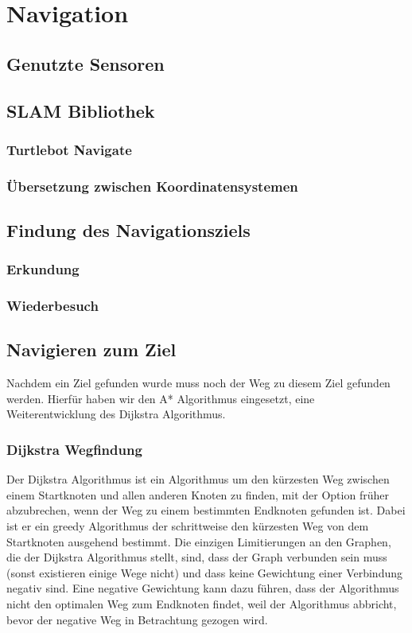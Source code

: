 \section{Navigation}\label{sec:navigation}
\subsection{Genutzte Sensoren}\label{subsec:genutzte-sensoren}

\subsection{SLAM Bibliothek}\label{subsec:slam-bibliothek}

\subsubsection{Turtlebot Navigate} %
\subsubsection{Übersetzung zwischen Koordinatensystemen}
\subsection{Findung des Navigationsziels}\label{subsec:findung-des-navigationsziels}

\subsubsection{Erkundung}
\subsubsection{Wiederbesuch}
\subsection{Navigieren zum Ziel}\label{subsec:navigierung-zum-ziel}
Nachdem ein Ziel gefunden wurde muss noch der Weg zu diesem Ziel gefunden werden.
Hierfür haben wir den A* Algorithmus eingesetzt, eine Weiterentwicklung des Dijkstra Algorithmus.
\subsubsection{Dijkstra Wegfindung}
Der Dijkstra Algorithmus ist ein Algorithmus um den kürzesten Weg zwischen einem Startknoten und allen anderen Knoten
zu finden, mit der Option früher abzubrechen, wenn der Weg zu einem bestimmten Endknoten gefunden ist.
Dabei ist er ein greedy Algorithmus der schrittweise den kürzesten Weg von dem Startknoten ausgehend bestimmt.
Die einzigen Limitierungen an den Graphen, die der Dijkstra Algorithmus stellt, sind, dass der Graph verbunden sein muss
(sonst existieren einige Wege nicht) und dass keine Gewichtung einer Verbindung negativ sind.
Eine negative Gewichtung kann dazu führen, dass der Algorithmus nicht den optimalen Weg zum Endknoten findet, weil der Algorithmus abbricht, bevor der negative
Weg in Betrachtung gezogen wird.

